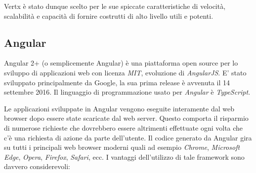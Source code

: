 Vertx è stato dunque scelto per le sue spiccate caratteristiche di velocità, scalabilità e capacità di fornire costrutti di alto livello utili e potenti.

\subsection{Angular}
Angular 2+ (o semplicemente Angular) è una piattaforma open source per lo sviluppo di applicazioni web con licenza \textit{MIT}, evoluzione di \textit{AngularJS}. E' stato sviluppato principalmente da Google, la sua prima release è avvenuta il 14 settembre 2016.
Il linguaggio di programmazione usato per \textit{Angular} è \textit{TypeScript}.

Le applicazioni sviluppate in Angular vengono eseguite interamente dal web browser dopo essere state scaricate dal web server. Questo comporta il risparmio di numerose richieste che dovrebbero essere altrimenti effettuate ogni volta che c'è una richiesta di azione da parte dell'utente. Il codice generato da Angular gira su tutti i principali web browser moderni quali ad esempio \textit{Chrome}, \textit{Microsoft Edge}, \textit{Opera}, \textit{Firefox}, \textit{Safari}, ecc.
I vantaggi dell'utilizzo di tale framework sono davvero considerevoli:
